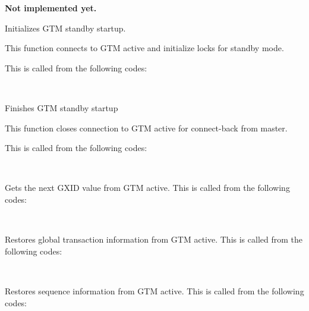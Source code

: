     \textbf{Not implemented yet.}
  
  
    Initializes GTM standby startup.
    
    This function connects to GTM active and initialize locks for standby mode.
    
    This is called from the following codes:
    
    \FuncRefHdr
		\\ \hline
    \FuncRefTrailor
  
  
    Finishes GTM standby startup
    
    This function closes connection to GTM active for connect-back from master.
    
    This is called from the following codes:
    
    \FuncRefHdr
		\\ \hline
    \FuncRefTrailor
  
  
    Gets the next GXID value from GTM active.
    This is called from the following codes:
    
    \FuncRefHdr
		\\ \hline
    \FuncRefTrailor
  
  
    Restores global transaction information from GTM active.
    This is called from the following codes:
    
    \FuncRefHdr
		\\ \hline
    \FuncRefTrailor
  
  
    Restores sequence information from GTM active.
    This is called from the following codes:
    
    \FuncRefHdr
		\\ \hline
    \FuncRefTrailor
  
